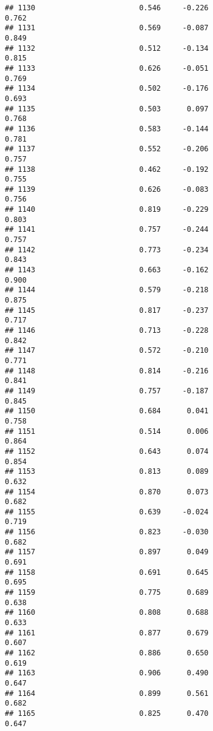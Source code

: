 \documentclass[
]{article}
\begin{document}
\begin{verbatim}
## 1130                        0.546     -0.226                     0.762
## 1131                        0.569     -0.087                     0.849
## 1132                        0.512     -0.134                     0.815
## 1133                        0.626     -0.051                     0.769
## 1134                        0.502     -0.176                     0.693
## 1135                        0.503      0.097                     0.768
## 1136                        0.583     -0.144                     0.781
## 1137                        0.552     -0.206                     0.757
## 1138                        0.462     -0.192                     0.755
## 1139                        0.626     -0.083                     0.756
## 1140                        0.819     -0.229                     0.803
## 1141                        0.757     -0.244                     0.757
## 1142                        0.773     -0.234                     0.843
## 1143                        0.663     -0.162                     0.900
## 1144                        0.579     -0.218                     0.875
## 1145                        0.817     -0.237                     0.717
## 1146                        0.713     -0.228                     0.842
## 1147                        0.572     -0.210                     0.771
## 1148                        0.814     -0.216                     0.841
## 1149                        0.757     -0.187                     0.845
## 1150                        0.684      0.041                     0.758
## 1151                        0.514      0.006                     0.864
## 1152                        0.643      0.074                     0.854
## 1153                        0.813      0.089                     0.632
## 1154                        0.870      0.073                     0.682
## 1155                        0.639     -0.024                     0.719
## 1156                        0.823     -0.030                     0.682
## 1157                        0.897      0.049                     0.691
## 1158                        0.691      0.645                     0.695
## 1159                        0.775      0.689                     0.638
## 1160                        0.808      0.688                     0.633
## 1161                        0.877      0.679                     0.607
## 1162                        0.886      0.650                     0.619
## 1163                        0.906      0.490                     0.647
## 1164                        0.899      0.561                     0.682
## 1165                        0.825      0.470                     0.647

\end{verbatim}
\end{document}
